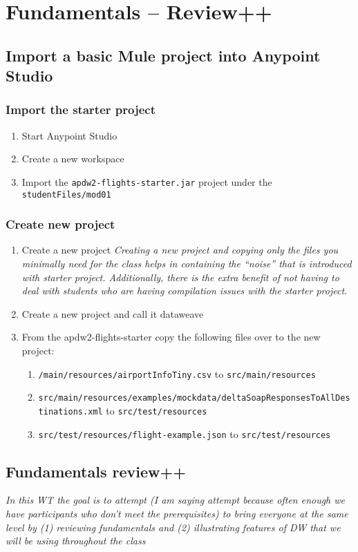 \chapter{Fundamentals -- Review++}
\section{Import a basic Mule project into Anypoint Studio}
\subsection{Import the starter project}
\begin{enumerate}
\item Start Anypoint Studio
\item Create a new workspace
\item Import the \texttt{apdw2-flights-starter.jar} project under the \texttt{studentFiles/mod01}
\end{enumerate}
\subsection{Create new project}
\begin{enumerate}[resume*]
\item Create a new project
  \newline
  \emph{
    Creating a new project and copying only the files you minimally need for the class helps in containing the ``noise'' that is introduced with starter project.  Additionally, there is the extra benefit of not having to deal with students who are having compilation issues with the starter project.
  }
\item Create a new project and call it dataweave
\item From the apdw2-flights-starter copy the following files over to the new project:
  \begin{enumerate}
  \item \texttt{/main/resources/airportInfoTiny.csv} to \texttt{src/main/resources}
  \item \texttt{src/main/resources/examples/mockdata/deltaSoapResponsesToAllDestinations.xml} to \texttt{src/test/resources}
  \item \texttt{src/test/resources/flight-example.json} to \texttt{src/test/resources}
  \end{enumerate}
\end{enumerate}

\section{Fundamentals review++}
\emph{
  In this WT the goal is to attempt (I am saying attempt because often enough we have participants who don’t meet the prerequisites) to bring everyone at the same level by (1) reviewing fundamentals and (2) illustrating features of DW that we will be using throughout the class
}

